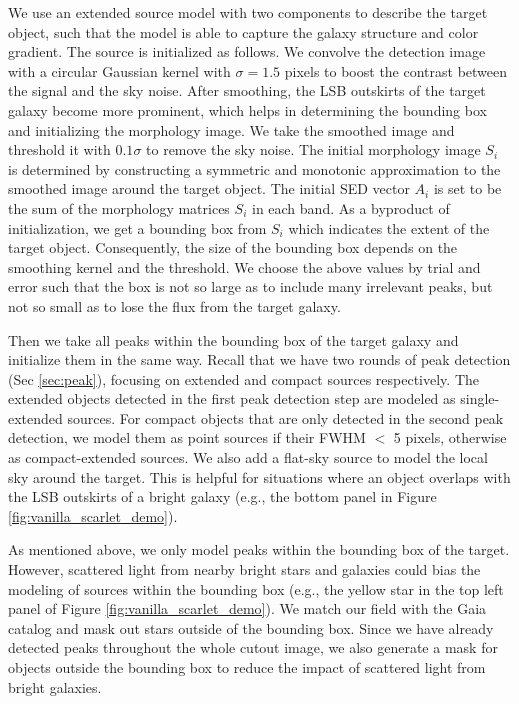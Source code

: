 \documentclass[twocolumn,astrosymb,twocolappendix]{aastex631}
\begin{document}
\begin{CJK*}{UTF8}{gbsn}
We use an extended source model with two components to describe the target object, such that the model is able to capture the galaxy structure and color gradient. The source is initialized as follows. We convolve the detection image with a circular Gaussian kernel with $\sigma=1.5$ pixels to boost the contrast between the signal and the sky noise. After smoothing, the LSB outskirts of the target galaxy become more prominent, which helps in determining the bounding box and initializing the morphology image. We take the smoothed image and threshold it with $0.1\sigma$ to remove the sky noise. The initial morphology image $S_i$ is determined by constructing a symmetric and monotonic approximation to the smoothed image around the target object. The initial SED vector $A_i$ is set to be the sum of the morphology matrices $S_i$ in each band. As a byproduct of initialization, we get a bounding box from $S_i$ which indicates the extent of the target object. Consequently, the size of the bounding box depends on the smoothing kernel and the threshold. We choose the above values by trial and error such that the box is not so large as to include many irrelevant peaks, but not so small as to lose the flux from the target galaxy. 

Then we take all peaks within the bounding box of the target galaxy and initialize them in the same way. Recall that we have two rounds of peak detection (Sec \ref{sec:peak}), focusing on extended and compact sources respectively. The extended objects detected in the first peak detection step are modeled as single-extended sources. For compact objects that are only detected in the second peak detection, we model them as point sources if their FWHM $<$ 5 pixels, otherwise as compact-extended sources. We also add a flat-sky source to model the local sky around the target. This is helpful for situations where an object overlaps with the LSB outskirts of a bright galaxy (e.g., the bottom panel in Figure \ref{fig:vanilla_scarlet_demo}).

As mentioned above, we only model peaks within the bounding box of the target. However, scattered light from nearby bright stars and galaxies could bias the modeling of sources within the bounding box (e.g., the yellow star in the top left panel of Figure \ref{fig:vanilla_scarlet_demo}). We match our field with the Gaia catalog and mask out stars outside of the bounding box. Since we have already detected peaks throughout the whole cutout image, we also generate a mask for objects outside the bounding box to reduce the impact of scattered light from bright galaxies. 


\end{CJK*}
\end{document}
